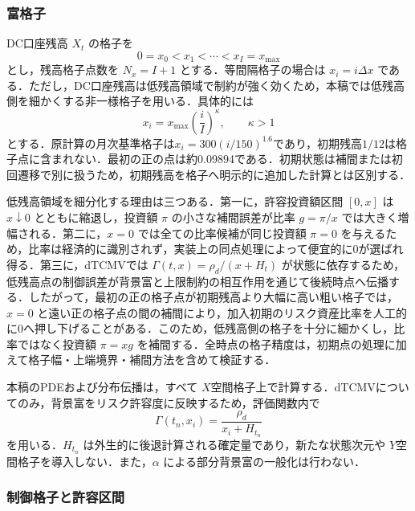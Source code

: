 \documentclass[10pt,a4paper]{article}
\theoremstyle{plain}
\theoremstyle{definition}
\begin{document}
\subsubsection{富格子}

DC口座残高 $X_t$ の格子を
\begin{equation}
  0=x_0<x_1<\cdots<x_I=x_{\max}
  \label{eq:wealth-grid}
\end{equation}
とし，残高格子点数を $N_x=I+1$ とする．等間隔格子の場合は $x_i=i\Delta x$ である．ただし，DC口座残高は低残高領域で制約が強く効くため，本稿では低残高側を細かくする非一様格子を用いる．具体的には
\begin{equation}
  x_i=x_{\max}\left(\frac{i}{I}\right)^\kappa,
  \qquad \kappa>1
  \label{eq:nonuniform-grid}
\end{equation}
とする．原計算の月次基準格子は$x_i=300(i/150)^{1.6}$であり，初期残高$1/12$は格子点に含まれない．最初の正の点は約0.09894である．初期状態は補間または初回遷移で別に扱うため，初期残高を格子へ明示的に追加した計算とは区別する．

低残高領域を細分化する理由は三つある．第一に，許容投資額区間 $[0,x]$ は $x\downarrow0$ とともに縮退し，投資額 $\pi$ の小さな補間誤差が比率 $g=\pi/x$ では大きく増幅される．第二に，$x=0$ では全ての比率候補が同じ投資額 $\pi=0$ を与えるため，比率は経済的に識別されず，実装上の同点処理によって便宜的に0が選ばれ得る．第三に，dTCMVでは $\Gamma(t,x)=\rho_d/(x+H_t)$ が状態に依存するため，低残高点の制御誤差が背景富と上限制約の相互作用を通じて後続時点へ伝播する．したがって，最初の正の格子点が初期残高より大幅に高い粗い格子では，$x=0$ と遠い正の格子点の間の補間により，加入初期のリスク資産比率を人工的に0へ押し下げることがある．このため，低残高側の格子を十分に細かくし，比率ではなく投資額 $\pi=xg$ を補間する．全時点の格子精度は，初期点の処理に加えて格子幅・上端境界・補間方法を含めて検証する．

本稿のPDEおよび分布伝播は，すべて $X$空間格子上で計算する．dTCMVについてのみ，背景富をリスク許容度に反映するため，評価関数内で
\begin{equation}
  \Gamma(t_n,x_i)=\frac{\rho_d}{x_i+H_{t_n}}
  \label{eq:gamma-grid}
\end{equation}
を用いる．$H_{t_n}$ は外生的に後退計算される確定量であり，新たな状態次元や $Y$空間格子を導入しない．また，$\alpha$ による部分背景富の一般化は行わない．

\subsubsection{制御格子と許容区間}
\end{document}

